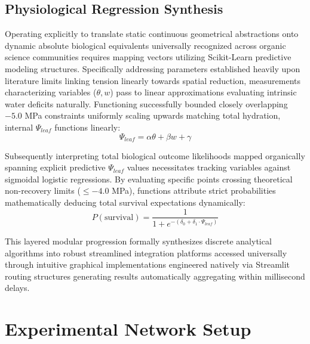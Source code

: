 \documentclass[conference]{IEEEtran}
\begin{document}
\subsection{Physiological Regression Synthesis}
Operating explicitly to translate static continuous geometrical abstractions onto dynamic absolute biological equivalents universally recognized across organic science communities requires mapping vectors utilizing Scikit-Learn predictive modeling structures. Specifically addressing parameters established heavily upon literature limits linking tension linearly towards spatial reduction, measurements characterizing variables ($\theta, w$) pass to linear approximations evaluating intrinsic water deficits naturally. Functioning successfully bounded closely overlapping $-5.0$ MPa constraints uniformly scaling upwards matching total hydration, internal $\Psi_{leaf}$ functions linearly:
\begin{equation}
\Psi_{leaf} = \alpha\theta + \beta w + \gamma
\label{eq:psi_derivation}
\end{equation}

Subsequently interpreting total biological outcome likelihoods mapped organically spanning explicit predictive $\Psi_{leaf}$ values necessitates tracking variables against sigmoidal logistic regressions. By evaluating specific points crossing theoretical non-recovery limits ($\le -4.0$ MPa), functions attribute strict probabilities mathematically deducing total survival expectations dynamically:
\begin{equation}
P(\text{survival}) = \frac{1}{1 + e^{-(\delta_0 + \delta_1 \cdot \Psi_{leaf})}}
\label{eq:survival_probability}
\end{equation}

This layered modular progression formally synthesizes discrete analytical algorithms into robust streamlined integration platforms accessed universally through intuitive graphical implementations engineered natively via Streamlit routing structures generating results automatically aggregating within millisecond delays.

\section{Experimental Network Setup}
\end{document}
